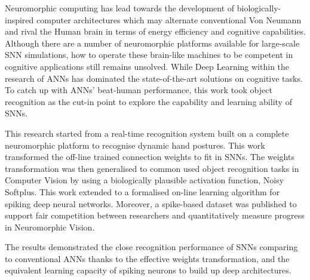 Neuromorphic computing has lead towards the development of biologically-inspired computer architectures which may alternate conventional Von Neumann and rival the Human brain in terms of energy efficiency and cognitive capabilities.
Although there are a number of neuromorphic platforms available for large-scale SNN simulations, how to operate these brain-like machines to be competent in cognitive applications still remains unsolved.
While Deep Learning within the research of ANNs has dominated the state-of-the-art solutions on cognitive tasks.
To catch up with ANNs' beat-human performance, this work took object recognition as the cut-in point to explore the capability and learning ability of SNNs.

This research started from a real-time recognition system built on a complete neuromorphic platform to recognise dynamic hand postures.
This work transformed the off-line trained connection weights to fit in SNNs.
The weights transformation was then generalised to common used object recognition tasks in Computer Vision by using a biologically plausible activation function, Noisy Softplus.
This work extended to a formalised on-line learning algorithm for spiking deep neural networks.
Moreover, a spike-based dataset was published to support fair competition between researchers and quantitatively measure progress in Neuromorphic Vision.

The results demonstrated the close recognition performance of SNNs comparing to conventional ANNs thanks to the effective weights transformation, and the equivalent learning capacity of spiking neurons to build up deep architectures.

